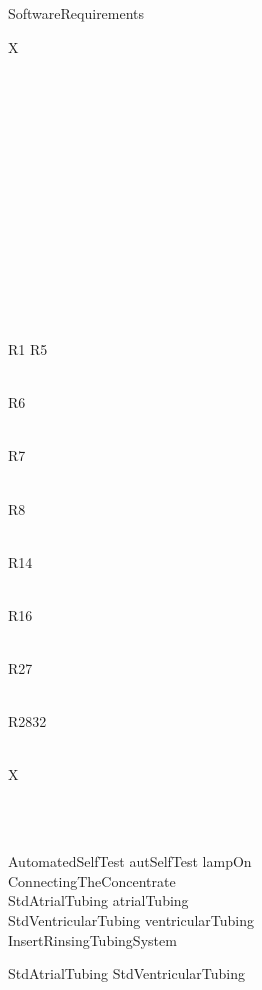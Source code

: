 \begin{circus}
	SoftwareRequirements \circdef \\
	\begin{block}
		\circmu X \circspot \\
			\begin{block}
				\\
				\begin{block}
					\\
						\begin{block}
							\\
								\begin{block}
									\\
										\begin{block}
											\\
												\begin{block}
													\\
														\begin{block}
															\\
																\begin{block}
																	\\
																		\begin{block}
																			R1 \interleave R5
																		\end{block}\\
																		 \interleave R6
																\end{block}\\
																 \interleave R7
														\end{block}\\
														 \interleave R8
												\end{block}\\
												 \interleave R14
										\end{block}\\
										 \interleave R16
								\end{block}\\
								 \interleave R27
						\end{block}\\
						 \interleave R2832
				\end{block}\\
				 \circseq X
			\end{block}\\
			
	\end{block}\\
	
	AutomatedSelfTest \circdef autSelfTest \then lampOn \then \Skip\\
	ConnectingTheConcentrate \circdef \Skip\\
	StdAtrialTubing \circdef atrialTubing \then \Skip\\
	StdVentricularTubing \circdef ventricularTubing \then \Skip\\
	InsertRinsingTubingSystem \circdef \\
	\begin{block}
		StdAtrialTubing \interleave StdVentricularTubing
	\end{block}\\
	

\end{circus}

